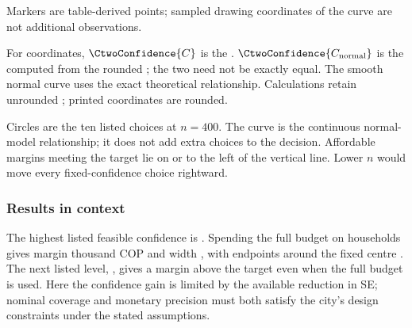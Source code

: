 \begin{landscape}
\begin{minipage}{\linewidth}
\begin{minipage}[t]{.43\linewidth}
Markers are table-derived points; sampled drawing coordinates of the curve are not additional observations.

For  coordinates, $\CtwoConfidence{C}$ is the . $\CtwoConfidence{C_{\rm normal}}$ is the  computed from the rounded ; the two need not be exactly equal. The smooth normal curve uses the exact theoretical relationship. Calculations retain unrounded ; printed coordinates are rounded.
\end{minipage}
\end{minipage}
\par\medskip

Circles are the ten listed choices at $n=400$. The curve is the continuous normal-model relationship; it does not add extra choices to the decision. Affordable margins meeting the target lie on or to the left of the vertical line. Lower $n$ would move every fixed-confidence choice rightward.
\end{landscape}
\subsubsection*{Results in context}
The highest listed feasible confidence is . Spending the full budget on  households gives margin  thousand COP and width , with endpoints  around the fixed centre . The next listed level, , gives a margin above the target even when the full budget is used. Here the confidence gain is limited by the available reduction in SE; nominal coverage and monetary precision must both satisfy the city's design constraints under the stated assumptions.

